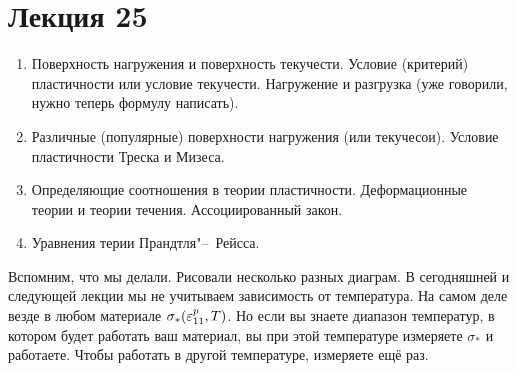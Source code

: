 \section{Лекция 25}
\begin{enumerate}
\item Поверхность нагружения и поверхность текучести.
Условие  (критерий) пластичности или условие текучести.
Нагружение и разгрузка (уже говорили, нужно теперь формулу написать).
\item Различные (популярные) поверхности нагружения (или текучесои).
Условие пластичности Треска и Мизеса.
\item Определяющие соотношения в теории пластичности.
Деформационные теории и теории течения. Ассоциированный закон.
\item Уравнения терии Прандтля"--~Рейсса.
\end{enumerate}

Вспомним, что мы делали. Рисовали несколько разных диаграм.
В сегодняшней  и следующей лекции мы не учитываем зависимость от температура. На  самом деле везде в любом материале $\sigma_*(\varepsilon_{11}^p,T)$. Но если вы знаете диапазон температур, в котором будет работать ваш материал, вы при этой температуре измеряете $\sigma_*$ и работаете. Чтобы работать в другой температуре, измеряете ещё раз.

